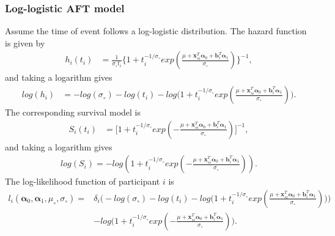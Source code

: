 \subsubsection*{Log-logistic AFT model}

Assume the time of event follows a log-logistic distribution. The hazard function is given by
\begin{equation}
    \begin{split}
        h_i(t_i) &= \frac{1}{\sigma_{\circ}t_i} \Big\{1 + t_i^{-1/\sigma_{\circ}}exp(\frac{\mu + \boldsymbol{x}_{si}^T \boldsymbol{\alpha}_0 + \boldsymbol{b}_i^T \boldsymbol{\alpha}_1}{\sigma_{\circ}}) \Big\}^{-1},
    \end{split}
\end{equation} and taking a logarithm gives
\begin{equation}
    \begin{split}
        log(h_i) &= -log(\sigma_{\circ}) - log(t_i) -  log\Big(1+t_i^{-1/\sigma_{\circ}}exp(\frac{\mu + \boldsymbol{x}_{si}^T \boldsymbol{\alpha}_0 + \boldsymbol{b}_i^T \boldsymbol{\alpha}_1}{\sigma_{\circ}}) \Big).
    \end{split}
\end{equation}
The corresponding survival model is 
\begin{equation}
    \begin{split}
        S_i(t_i) &= \Big[1+t_i^{-1/\sigma_{\circ}}exp(- \frac{\mu + \boldsymbol{x}_{si}^T \boldsymbol{\alpha}_0 + \boldsymbol{b}_i^T \boldsymbol{\alpha}_1}{\sigma_{\circ}}) \Big]^{-1},
    \end{split}
\end{equation}
and taking a logarithm gives
\begin{equation}
    \begin{split}
        log(S_i) = -log(1+t_i^{-1/\sigma_{\circ}}exp(- \frac{\mu + \boldsymbol{x}_{si}^T \boldsymbol{\alpha}_0 + \boldsymbol{b}_i^T \boldsymbol{\alpha}_1}{\sigma_{\circ}})).
    \end{split}
\end{equation}
The log-likelihood function of participant $i$ is
\begin{equation}
    \begin{split}
        l_i(\boldsymbol{\alpha}_0, \boldsymbol{\alpha}_1, \mu_{\circ}, \sigma_{\circ}) =& \delta_i \Big(-log(\sigma_{\circ}) - log(t_i) -  log\Big(1+t_i^{-1/\sigma_{\circ}}exp(\frac{\mu + \boldsymbol{x}_{si}^T \boldsymbol{\alpha}_0 + \boldsymbol{b}_i^T \boldsymbol{\alpha}_1}{\sigma_{\circ}}) \Big) \Big)\\
        &- log \big(1+t_i^{-1/\sigma_{\circ}}exp(- \frac{\mu + \boldsymbol{x}_{si}^T \boldsymbol{\alpha}_0 + \boldsymbol{b}_i^T \boldsymbol{\alpha}_1}{\sigma_{\circ}}) \big).
    \end{split}
    \label{eq:logl3}
\end{equation}
